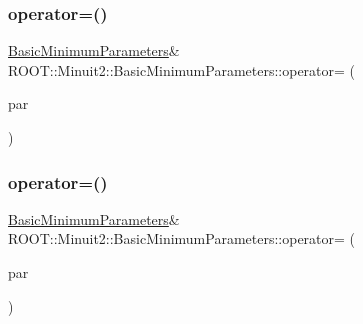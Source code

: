 \subsubsection{\texorpdfstring{operator=()}{operator=()}\hspace{0.1cm}{\footnotesize\ttfamily [1/3]}}
{\footnotesize\ttfamily \mbox{\hyperlink{classROOT_1_1Minuit2_1_1BasicMinimumParameters}{Basic\+Minimum\+Parameters}}\& R\+O\+O\+T\+::\+Minuit2\+::\+Basic\+Minimum\+Parameters\+::operator= (\begin{DoxyParamCaption}\item[{const \mbox{\hyperlink{classROOT_1_1Minuit2_1_1BasicMinimumParameters}{Basic\+Minimum\+Parameters}} \&}]{par }\end{DoxyParamCaption})\hspace{0.3cm}{\ttfamily [inline]}}

\mbox{\label{classROOT_1_1Minuit2_1_1BasicMinimumParameters_a468d3eefd1f7080b499f090afdb3eab4}} 
\subsubsection{\texorpdfstring{operator=()}{operator=()}\hspace{0.1cm}{\footnotesize\ttfamily [2/3]}}
{\footnotesize\ttfamily \mbox{\hyperlink{classROOT_1_1Minuit2_1_1BasicMinimumParameters}{Basic\+Minimum\+Parameters}}\& R\+O\+O\+T\+::\+Minuit2\+::\+Basic\+Minimum\+Parameters\+::operator= (\begin{DoxyParamCaption}\item[{const \mbox{\hyperlink{classROOT_1_1Minuit2_1_1BasicMinimumParameters}{Basic\+Minimum\+Parameters}} \&}]{par }\end{DoxyParamCaption})\hspace{0.3cm}{\ttfamily [inline]}}

\mbox{\label{classROOT_1_1Minuit2_1_1BasicMinimumParameters_a468d3eefd1f7080b499f090afdb3eab4}} 

